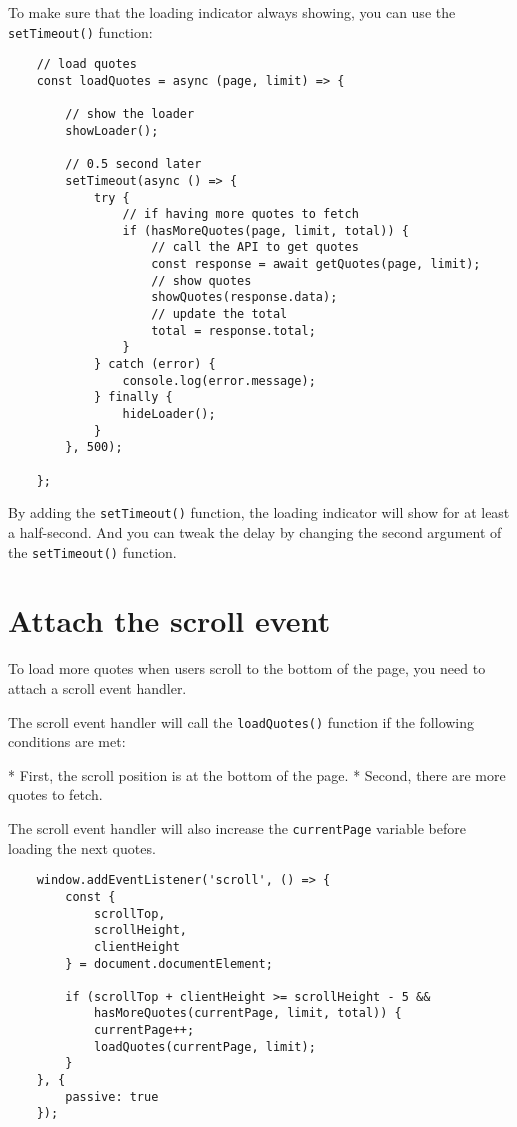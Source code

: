 \documentclass[11pt]{article}
\begin{document}
\noindent
To make sure that the loading indicator always showing,
you can use the \verb|setTimeout()| function:

\begin{lstlisting}
    // load quotes
    const loadQuotes = async (page, limit) => {

        // show the loader
        showLoader();

        // 0.5 second later
        setTimeout(async () => {
            try {
                // if having more quotes to fetch
                if (hasMoreQuotes(page, limit, total)) {
                    // call the API to get quotes
                    const response = await getQuotes(page, limit);
                    // show quotes
                    showQuotes(response.data);
                    // update the total
                    total = response.total;
                }
            } catch (error) {
                console.log(error.message);
            } finally {
                hideLoader();
            }
        }, 500);

    };
\end{lstlisting}

\noindent
By adding the \verb|setTimeout()| function, the loading indicator will
show for at least a half-second. And you can tweak the delay by
changing the second argument of the \verb|setTimeout()| function.

\section*{Attach the scroll event}

To load more quotes when users scroll to the bottom of the page,
you need to attach a scroll event handler.
\newline

\noindent
The scroll event handler will call the \verb|loadQuotes()| function
if the following conditions are met:

* First, the scroll position is at the bottom of the page.
* Second, there are more quotes to fetch.

The scroll event handler will also increase the \verb|currentPage|
variable before loading the next quotes.

\begin{lstlisting}
    window.addEventListener('scroll', () => {
        const {
            scrollTop,
            scrollHeight,
            clientHeight
        } = document.documentElement;

        if (scrollTop + clientHeight >= scrollHeight - 5 &&
            hasMoreQuotes(currentPage, limit, total)) {
            currentPage++;
            loadQuotes(currentPage, limit);
        }
    }, {
        passive: true
    });
\end{lstlisting}
\end{document}
